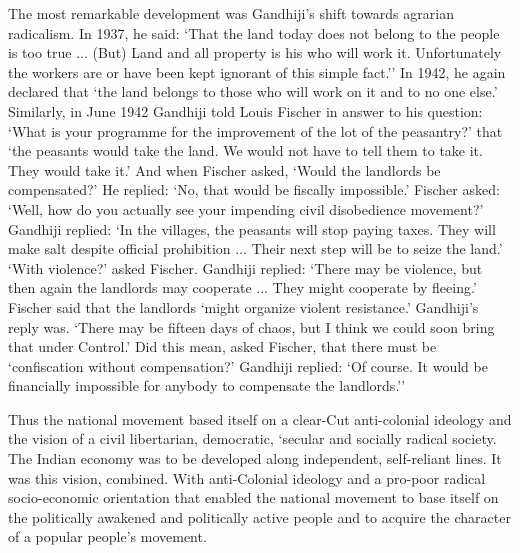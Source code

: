 \begin{multicols}{2}
The most remarkable development was Gandhiji's shift towards agrarian radicalism. In 1937, he said: `That the land today does not belong to the people is too true ... (But) Land and all property is his who will work it. Unfortunately the workers are or have been kept ignorant of this simple fact.'' In 1942, he again declared that `the land belongs to those who will work on it and to no one else.' Similarly, in June 1942 Gandhiji told Louis Fischer in answer to his question: `What is your programme for the improvement of the lot of the peasantry?' that `the peasants would take the land. We would not have to tell them to take it. They would take it.' And when Fischer asked, `Would the landlords be compensated?' He replied: `No, that would be fiscally impossible.' Fischer asked: `Well, how do you actually see your impending civil disobedience movement?' Gandhiji replied: `In the villages, the peasants will stop paying taxes. They will make salt despite official prohibition ... Their next step will be to seize the land.' `With violence?' asked Fischer. Gandhiji replied: `There may be violence, but then again the landlords may cooperate ... They might cooperate by fleeing.' Fischer said that the landlords `might organize violent resistance.' Gandhiji's reply was. `There may be fifteen days of chaos, but I think we could soon bring that under Control.' Did this mean, asked Fischer, that there must be `confiscation without compensation?' Gandhiji replied: `Of course. It would be financially impossible for anybody to compensate the landlords.''

Thus the national movement based itself on a clear-Cut anti-colonial ideology and the vision of a civil libertarian, democratic, `secular and socially radical society. The Indian economy was to be developed along independent, self-reliant lines. It was this vision, combined. With anti-Colonial ideology and a pro-poor radical socio-economic orientation that enabled the national movement to base itself on the politically awakened and politically active people and to acquire the character of a popular people's movement.
\end{multicols}